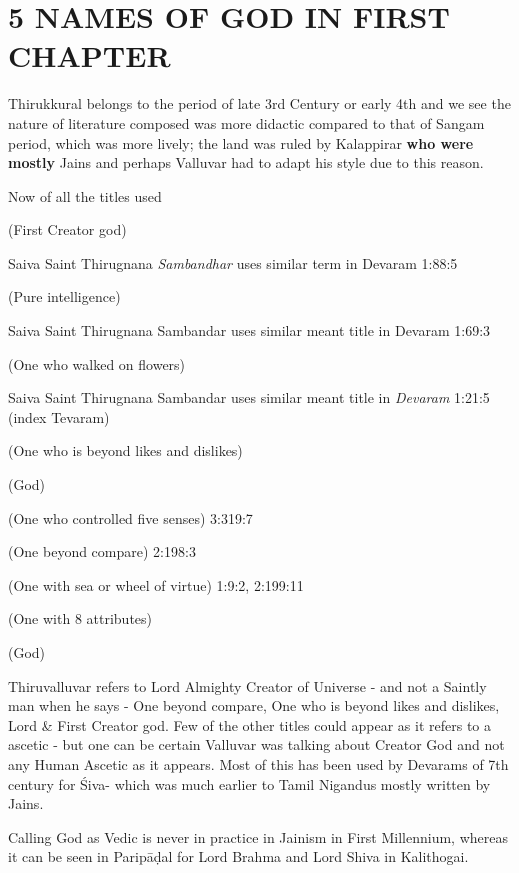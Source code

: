 \section*{5 NAMES OF GOD IN FIRST CHAPTER}

Thirukkural belongs to the period of late 3rd Century or early 4th and we see the nature of literature composed was more didactic compared to that of Sangam period, which was more lively; the land was ruled by Kalappirar \textbf{who were mostly} Jains and perhaps Valluvar had to adapt his style due to this reason.

Now of all the titles used

 (First Creator god)

Saiva Saint Thirugnana \textit{Sambandhar} uses similar term in Devaram 1:88:5

 (Pure intelligence)

Saiva Saint Thirugnana Sambandar uses similar meant title in Devaram 1:69:3

 (One who walked on flowers)

Saiva Saint Thirugnana Sambandar uses similar meant title in \textit{Devaram} 1:21:5 (index Tevaram)

 (One who is beyond likes and dislikes)

 (God)

 (One who controlled five senses) 3:319:7

 (One beyond compare) 2:198:3

 (One with sea or wheel of virtue) 1:9:2, 2:199:11

 (One with 8 attributes)

 (God)

Thiruvalluvar refers to Lord Almighty Creator of Universe - and not a Saintly man when he says - One beyond compare, One who is beyond likes and dislikes, Lord \& First Creator god. Few of the other titles could appear as it refers to a ascetic - but one can be certain Valluvar was talking about Creator God and not any Human Ascetic as it appears. Most of this has been used by Devarams of 7th century for Śiva- which was much earlier to Tamil Nigandus mostly written by Jains.

Calling God as Vedic is never in practice in Jainism in First Millennium, whereas it can be seen in Paripāḍal for Lord Brahma and Lord Shiva in Kalithogai.

